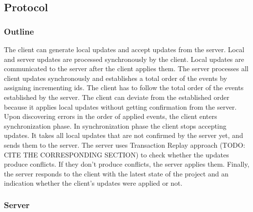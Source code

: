 \documentclass[a4paper, 11pt, oneside]{article}
\theoremstyle{definition}
\begin{document}
\subsection{Protocol}

\subsubsection{Outline}

The client can generate local updates and accept updates from the server. Local and server updates are processed synchronously by the client. Local updates are communicated to the server after the client applies them. The server processes all client updates synchronously and establishes a total order of the events by assigning incrementing ids. The client has to follow the total order of the events established by the server. The client can deviate from the established order because it applies local updates without getting confirmation from the server. Upon discovering errors in the order of applied events, the client enters synchronization phase. In synchronization phase the client stops accepting updates. It takes all local updates that are not confirmed by the server yet, and sends them to the server. The server uses Transaction Replay approach (TODO: CITE THE CORRESPONDING SECTION) to check whether the updates produce conflicts. If they don't produce conflicts, the server applies them. Finally, the server responds to the client with the latest state of the project and an indication whether the client's updates were applied or not.

\subsubsection{Server}




\newpage
\printbibliography
\clearpage
\end{document}
